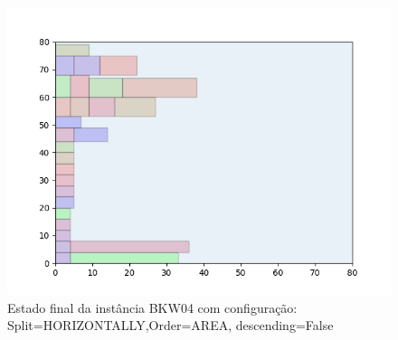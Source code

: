 \begin{figure}[H]
    \centering
    \caption[]{Estado final da instância BKW04 com configuração: Split=HORIZONTALLY,Order=AREA, descending=False}
    \label{fig:bkw04-horizontally-area-false}
    \includegraphics[scale=0.5]{output/figures/bkw/bkw04/horizontally/area/false/00}
\end{figure}
